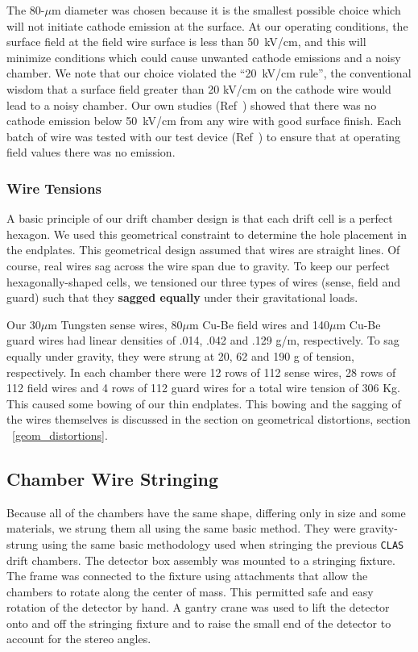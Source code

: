 The 80-$\mu$m diameter was chosen because it is the smallest possible choice
which will not initiate cathode emission at the surface.
At our operating conditions, the surface field at the field wire
surface is less than 50~kV/cm, and this will minimize 
conditions which could cause unwanted cathode emissions and a noisy chamber.  
We note that
our choice violated the ``20~kV/cm rule'', the conventional wisdom that
a surface field greater than 20 kV/cm on the cathode wire would lead to 
a noisy chamber.
Our own studies (Ref~\cite{cathode-emission}) showed that there was no cathode
emission below 50~kV/cm from any wire with good surface finish.  Each batch
of wire was tested with our test device (Ref~\cite{patent}) to ensure that at operating field 
values there was no emission.  

\subsubsection{Wire Tensions}
A basic principle of our drift chamber design is that each drift cell is a perfect hexagon.
We used this geometrical constraint to determine the hole placement in the endplates.
This geometrical design assumed that wires are straight lines.  Of course, real wires
sag across the wire span due to gravity.  To keep our perfect hexagonally-shaped cells,
we tensioned our three types of wires (sense, field and guard) such that they
{\bf sagged equally} under their gravitational loads.

Our 30$\mu$m Tungsten sense wires, 80$\mu$m Cu-Be field wires and 140$\mu$m Cu-Be guard
wires had linear densities of .014, .042 and .129 g/m, respectively.  To sag equally
under gravity, they were strung at 20, 62 and 190 g of tension, respectively.
In each chamber there were 12 rows of 112 sense wires, 28 rows of 112 field wires
and 4 rows of 112 guard wires for a total wire tension of 306 Kg.
This caused some bowing of our thin endplates.  This bowing and the sagging
of the wires themselves is discussed in the section on geometrical distortions,
section ~\ref{geom_distortions}.


\subsection{Chamber Wire Stringing}


Because all of the chambers have the same shape, differing only in
size and some materials, we strung them all using the same basic method.
They were gravity-strung using the same basic methodology 
used when stringing the previous {\tt CLAS} drift chambers.  The detector box 
assembly was mounted to a stringing fixture.  The frame was connected to 
the fixture using attachments that allow the chambers to rotate along 
the center of mass.  This permitted safe and easy 
rotation of the detector by hand.  A gantry crane was used to lift the 
detector onto and off the stringing fixture and to raise the small end of 
the detector to account for the stereo angles.

